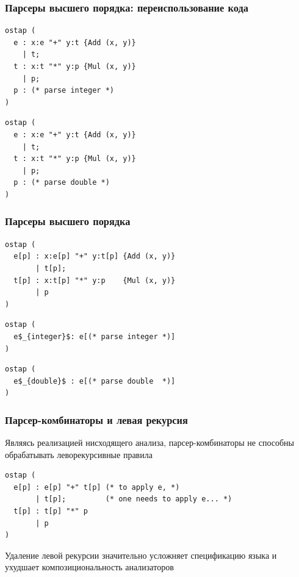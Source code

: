 \documentclass{beamer}
\begin{document}
\begin{frame}[fragile]
  \transwipe[direction=90]
  \frametitle{Парсеры высшего порядка: переиспользование кода}  
\begin{lstlisting}[frame=single]  
ostap (
  e : x:e "+" y:t {Add (x, y)} 
    | t; 
  t : x:t "*" y:p {Mul (x, y)} 
    | p;
  p : (* parse integer *)
)
\end{lstlisting}
  
\begin{lstlisting}[frame=single]  
ostap (
  e : x:e "+" y:t {Add (x, y)} 
    | t; 
  t : x:t "*" y:p {Mul (x, y)} 
    | p;
  p : (* parse double *)
)
\end{lstlisting}	  
  
\end{frame}


\begin{frame}[fragile]
  \transwipe[direction=90]
  \frametitle{Парсеры высшего порядка}  
\begin{lstlisting}[frame=single]  
ostap (
  e[p] : x:e[p] "+" y:t[p] {Add (x, y)} 
       | t[p]; 
  t[p] : x:t[p] "*" y:p    {Mul (x, y)} 
       | p
)
\end{lstlisting}
  
\begin{lstlisting}[frame=single]  
ostap (
  e$_{integer}$: e[(* parse integer *)]
)
\end{lstlisting}
  
\begin{lstlisting}[frame=single] 
ostap (
  e$_{double}$ : e[(* parse double  *)]
)
\end{lstlisting}
\end{frame}


\begin{frame}[fragile]
  \transwipe[direction=90]
  \frametitle{Парсер-комбинаторы и левая рекурсия}  
Являясь реализацией нисходящего анализа, парсер-комбинаторы не способны обрабатывать леворекурсивные правила

\begin{lstlisting}[frame=single]  
ostap (
  e[p] : e[p] "+" t[p] (* to apply e, *)
       | t[p];         (* one needs to apply e... *)
  t[p] : t[p] "*" p    
       | p
)
\end{lstlisting}

Удаление левой рекурсии значительно усложняет спецификацию языка и ухудшает композициональность анализаторов
\end{frame}
\end{document}
